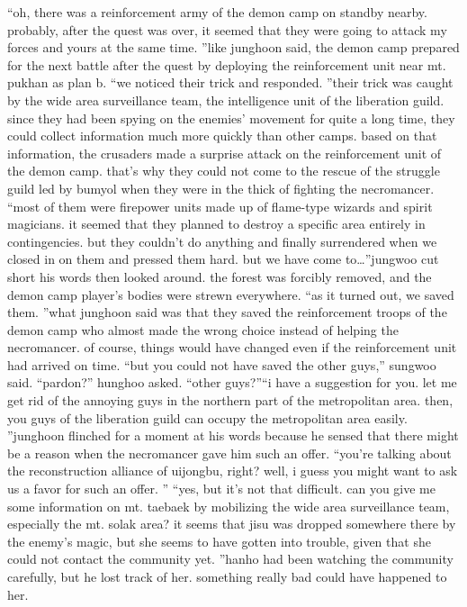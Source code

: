 “oh, there was a reinforcement army of the demon camp on standby nearby.
 probably, after the quest was over, it seemed that they were going to attack my forces and yours at the same time.
”like junghoon said, the demon camp prepared for the next battle after the quest by deploying the reinforcement unit near mt.
 pukhan as plan b.
“we noticed their trick and responded.
”their trick was caught by the wide area surveillance team, the intelligence unit of the liberation guild.
 since they had been spying on the enemies’ movement for quite a long time, they could collect information much more quickly than other camps.
based on that information, the crusaders made a surprise attack on the reinforcement unit of the demon camp.
 that’s why they could not come to the rescue of the struggle guild led by bumyol when they were in the thick of fighting the necromancer.
“most of them were firepower units made up of flame-type wizards and spirit magicians.
 it seemed that they planned to destroy a specific area entirely in contingencies.
 but they couldn’t do anything and finally surrendered when we closed in on them and pressed them hard.
 but we have come to…”jungwoo cut short his words then looked around.
 the forest was forcibly removed, and the demon camp player’s bodies were strewn everywhere.
“as it turned out, we saved them.
”what junghoon said was that they saved the reinforcement troops of the demon camp who almost made the wrong choice instead of helping the necromancer.
of course, things would have changed even if the reinforcement unit had arrived on time.
“but you could not have saved the other guys,” sungwoo said.
“pardon?” hunghoo asked.
“other guys?”“i have a suggestion for you.
 let me get rid of the annoying guys in the northern part of the metropolitan area.
 then, you guys of the liberation guild can occupy the metropolitan area easily.
”junghoon flinched for a moment at his words because he sensed that there might be a reason when the necromancer gave him such an offer.
“you’re talking about the reconstruction alliance of uijongbu, right? well, i guess you might want to ask us a favor for such an offer.
”
“yes, but it’s not that difficult.
 can you give me some information on mt.
 taebaek by mobilizing the wide area surveillance team, especially the mt.
 solak area? it seems that jisu was dropped somewhere there by the enemy’s magic, but she seems to have gotten into trouble, given that she could not contact the community yet.
”hanho had been watching the community carefully, but he lost track of her.
 something really bad could have happened to her.
